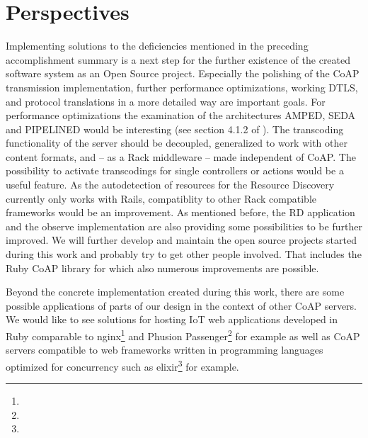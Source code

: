 \section{Perspectives}

	Implementing solutions to the deficiencies mentioned in the preceding
	accomplishment summary is a next step for the further existence of the
	created software system as an Open Source project. Especially the polishing
	of the \ac{CoAP} transmission implementation, further performance
	optimizations, working \ac{DTLS}, and protocol translations in a more
	detailed way are important goals. For performance optimizations the
	examination of the architectures \acs{AMPED}, \acs{SEDA} and PIPELINED
	would be interesting (see section 4.1.2 of \cite{scalable-iot}). The
	transcoding functionality of the server should be decoupled, generalized to
	work with other content formats, and -- as a Rack middleware -- made
	independent of \ac{CoAP}. The possibility to activate transcodings for
	single controllers or actions would be a useful feature. As the
	autodetection of resources for the Resource Discovery currently only works
	with \ac{Rails}, compatiblity to other Rack compatible frameworks would be
	an improvement. As mentioned before, the \ac{RD} application and the
	observe implementation are also providing some possibilities to be further
	improved. We will further develop and maintain the open source projects
	started during this work and probably try to get other people involved.
	That includes the Ruby \ac{CoAP} library for which also numerous
	improvements are possible.

	Beyond the concrete implementation created during this work, there are some
	possible applications of parts of our design in the context of other
	\ac{CoAP} servers. We would like to see solutions for hosting \ac{IoT} web
	applications developed in Ruby comparable to nginx\footnote{\urlNginx} and
	Phusion Passenger\footnote{\urlPassenger} for example as well as \ac{CoAP}
	servers compatible to web frameworks written in programming languages
	optimized for concurrency such as elixir\footnote{\urlElixir} for example.
